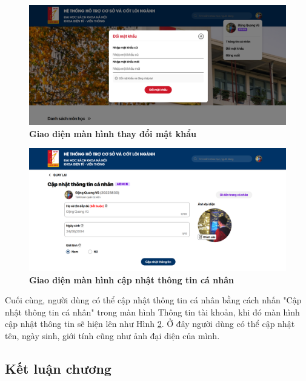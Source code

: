 \documentclass{article}
\begin{document}
	 \begin{figure}[!ht]
	 	\centering
	 	\includegraphics[trim= 10pt 10pt 10pt 10pt, clip, width=14cm]{localhost_3000_changepass.png}
	 	\caption [Giao diện màn hình thay đổi mật khẩu]{\bfseries \fontsize{12pt}{0pt}\selectfont Giao diện màn hình thay đổi mật khẩu}
	 	\label{fig413}
	 \end{figure}
	 
	 \begin{figure}[!ht]
	 	\centering
	 	\includegraphics[trim= 10pt 10pt 10pt 10pt, clip, width=14cm]{localhost_3000_update-info.png}
	 	\caption [Giao diện màn hình cập nhật thông tin cá nhân]{\bfseries \fontsize{12pt}{0pt}\selectfont Giao diện màn hình cập nhật thông tin cá nhân}
	 	\label{fig414}
	 \end{figure}
	 
	 Cuối cùng, người dùng có thể cập nhật thông tin cá nhân bằng cách nhấn "Cập nhật thông tin cá nhân" trong màn hình Thông tin tài khoản, khi đó màn hình cập nhật thông tin sẽ hiện lên như Hình \ref{fig414}. Ở đây người dùng có thể cập nhật tên, ngày sinh, giới tính cũng như ảnh đại diện của mình.
	 
	 \subsection{Kết luận chương}
	 
\end{document}
